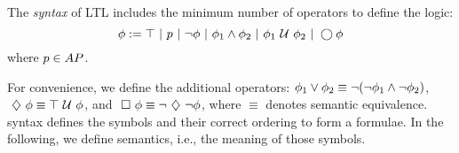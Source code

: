 \documentclass{ifacconf}
\begin{document}
    \begin{definition}
    \label{def:gdtl-syntax}
    The {\em syntax} of LTL includes the minimum number of operators to define the logic:
    \begin{equation*}
     \phi :=  \True \ |\ p \ |\ \notltl \phi \ |\ \phi_1 \andltl \phi_2 \ |\ \phi_1 \Until \phi_2 \ |\ \Next \phi
    \end{equation*} 
    where $p\in AP$.
    \end{definition}

    For convenience, we define the additional operators:
    $\phi_1 \vee \phi_2 \equiv  \neg (\neg \phi_1 \wedge \neg \phi_2)$,
    $\ \diamondsuit\  \phi \equiv \top \ \mathcal{U}\  \phi$, and
    $\ \square\  \phi \equiv \neg \ \diamondsuit\  \neg \phi$,
    where $\equiv$ denotes semantic equivalence. \DTL syntax defines the symbols and their correct ordering to form a formulae. In the following, we define \DTL semantics, i.e., the meaning of those symbols.
\end{document}
